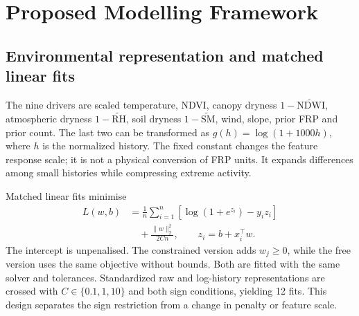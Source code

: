 \documentclass[conference]{IEEEtran}
\begin{document}
\section{Proposed Modelling Framework}
\subsection{Environmental representation and matched linear fits}
The nine drivers are scaled temperature, NDVI, canopy dryness $1-\widetilde{\mathrm{NDWI}}$, atmospheric dryness $1-\widetilde{\mathrm{RH}}$, soil dryness $1-\widetilde{\mathrm{SM}}$, wind, slope, prior FRP and prior count. The last two can be transformed as $g(h)=\log(1+1000h)$, where $h$ is the normalized history. The fixed constant changes the feature response scale; it is not a physical conversion of FRP units. It expands differences among small histories while compressing extreme activity.

Matched linear fits minimise
\begin{equation}
\begin{aligned}
 L(w,b)&=\frac1n\sum_{i=1}^{n}\left[\log(1+e^{z_i})-y_i z_i\right]\\
 &\quad+\frac{\|w\|_2^2}{2Cn},\qquad z_i=b+x_i^\top w.
\end{aligned}
\end{equation}
The intercept is unpenalised. The constrained version adds $w_j\geq0$, while the free version uses the same objective without bounds. Both are fitted with the same solver and tolerances. Standardized raw and log-history representations are crossed with $C\in\{0.1,1,10\}$ and both sign conditions, yielding 12 fits. This design separates the sign restriction from a change in penalty or feature scale.
\end{document}
